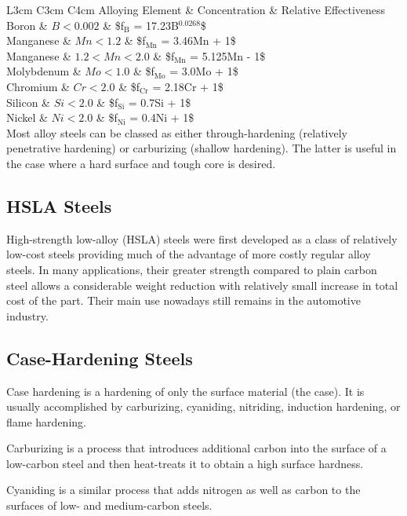 \documentclass[a4paper,openany,12pt]{book}
\begin{document}
 L3cm C3cm C4cm Alloying Element \& Concentration \& Relative
Effectiveness\\
Boron \& \(B < 0.002\) \& \$f\(_{\text{B}}\) = 17.23B\(^{\text{0.0268}}\)\$\\
Manganese \& \(Mn < 1.2\) \& \$f\(_{\text{Mn}}\) = 3.46Mn + 1\$\\
Manganese \& \(1.2 < Mn < 2.0\) \& \$f\(_{\text{Mn}}\) = 5.125Mn - 1\$\\
Molybdenum \& \(Mo < 1.0\) \& \$f\(_{\text{Mo}}\) = 3.0Mo + 1\$\\
Chromium \& \(Cr < 2.0\) \& \$f\(_{\text{Cr}}\) = 2.18Cr + 1\$\\
Silicon \& \(Si < 2.0\) \& \$f\(_{\text{Si}}\) = 0.7Si + 1\$\\
Nickel \& \(Ni < 2.0\) \& \$f\(_{\text{Ni}}\) = 0.4Ni + 1\$\\

Most alloy steels can be classed as either through-hardening (relatively
penetrative hardening) or carburizing (shallow hardening). The latter is
useful in the case where a hard surface and tough core is desired.

\subsection{HSLA Steels}
\label{sec:org1787eb0}
High-strength low-alloy (HSLA) steels were first developed as a class of
relatively low-cost steels providing much of the advantage of more
costly regular alloy steels. In many applications, their greater
strength compared to plain carbon steel allows a considerable weight
reduction with relatively small increase in total cost of the part.
Their main use nowadays still remains in the automotive industry.

\subsection{Case-Hardening Steels}
\label{sec:org8b87001}
Case hardening is a hardening of only the surface material (the case).
It is usually accomplished by carburizing, cyaniding, nitriding,
induction hardening, or flame hardening.

Carburizing is a process that introduces additional carbon into the
surface of a low-carbon steel and then heat-treats it to obtain a high
surface hardness.

Cyaniding is a similar process that adds nitrogen as well as carbon to
the surfaces of low- and medium-carbon steels.
\end{document}
